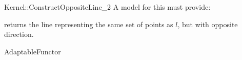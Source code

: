 \begin{ccRefFunctionObjectConcept}{Kernel::ConstructOppositeLine_2}
A model for this must provide:


{returns the line representing the same set of points as $l$,
but with opposite direction.}

\ccRefines
AdaptableFunctor

\ccSeeAlso
{} \\

\end{ccRefFunctionObjectConcept}
